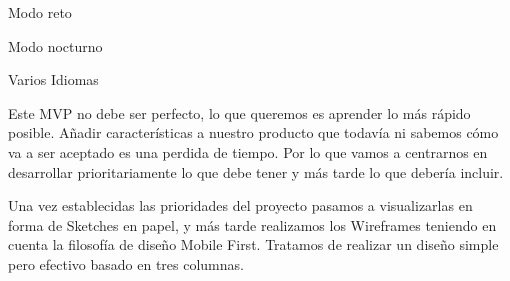 \documentclass[12pt,twoside,titlepage]{report}
\begin{document}
\begin{compactitem}
    \item Modo reto
    \item Modo nocturno
    \item Varios Idiomas
\end{compactitem}


Este MVP no debe ser perfecto, lo que queremos es aprender lo más rápido posible. Añadir características a nuestro producto que todavía ni sabemos cómo va a ser aceptado es una perdida de tiempo. Por lo que vamos a centrarnos en desarrollar prioritariamente lo que debe tener y más tarde lo que debería incluir.

Una vez establecidas las prioridades del proyecto pasamos a visualizarlas en forma de Sketches en papel, y más tarde realizamos los Wireframes teniendo en cuenta la filosofía de diseño Mobile First. Tratamos de realizar un diseño simple pero efectivo basado en tres columnas.

\end{document}
